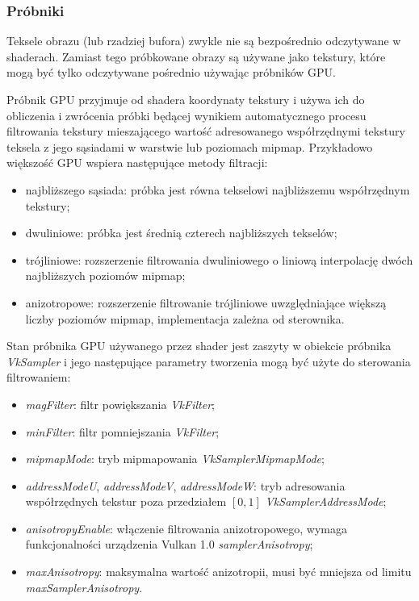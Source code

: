 \subsubsection{Próbniki}

Teksele obrazu (lub rzadziej bufora) zwykle nie są bezpośrednio odczytywane w shaderach.
Zamiast tego próbkowane obrazy są używane jako tekstury, które mogą być tylko odczytywane pośrednio używając próbników GPU.

Próbnik GPU przyjmuje od shadera koordynaty tekstury i używa ich do obliczenia i zwrócenia próbki będącej wynikiem automatycznego procesu filtrowania tekstury mieszającego wartość adresowanego współrzędnymi tekstury teksela z jego sąsiadami w warstwie lub poziomach mipmap.
Przykładowo większość GPU wspiera następujące metody filtracji:
\begin{itemize}
	\item najbliższego sąsiada: próbka jest równa tekselowi najbliższemu współrzędnym tekstury;
	\item dwuliniowe: próbka jest średnią czterech najbliższych tekselów;
	\item trójliniowe: rozszerzenie filtrowania dwuliniowego o liniową interpolację dwóch najbliższych poziomów mipmap;
	\item anizotropowe: rozszerzenie filtrowanie trójliniowe uwzględniające większą liczby poziomów mipmap, implementacja zależna od sterownika.
\end{itemize}

Stan próbnika GPU używanego przez shader jest zaszyty w obiekcie próbnika \textit{VkSampler} i jego następujące parametry tworzenia mogą być użyte do sterowania filtrowaniem:
\begin{itemize}
	\item \textit{magFilter}: filtr powiększania \textit{VkFilter};
	\item \textit{minFilter}: filtr pomniejszania \textit{VkFilter};
	\item \textit{mipmapMode}: tryb mipmapowania \textit{VkSamplerMipmapMode};
	\item \textit{addressModeU}, \textit{addressModeV}, \textit{addressModeW}: tryb adresowania współrzędnych tekstur poza przedziałem $\left[0,1\right]$ \textit{VkSamplerAddressMode};
	\item \textit{anisotropyEnable}: włączenie filtrowania anizotropowego, wymaga funkcjonalności urządzenia Vulkan 1.0 \textit{samplerAnisotropy};
	\item \textit{maxAnisotropy}: maksymalna wartość anizotropii, musi być mniejsza od limitu \textit{maxSamplerAnisotropy}.
\end{itemize}


